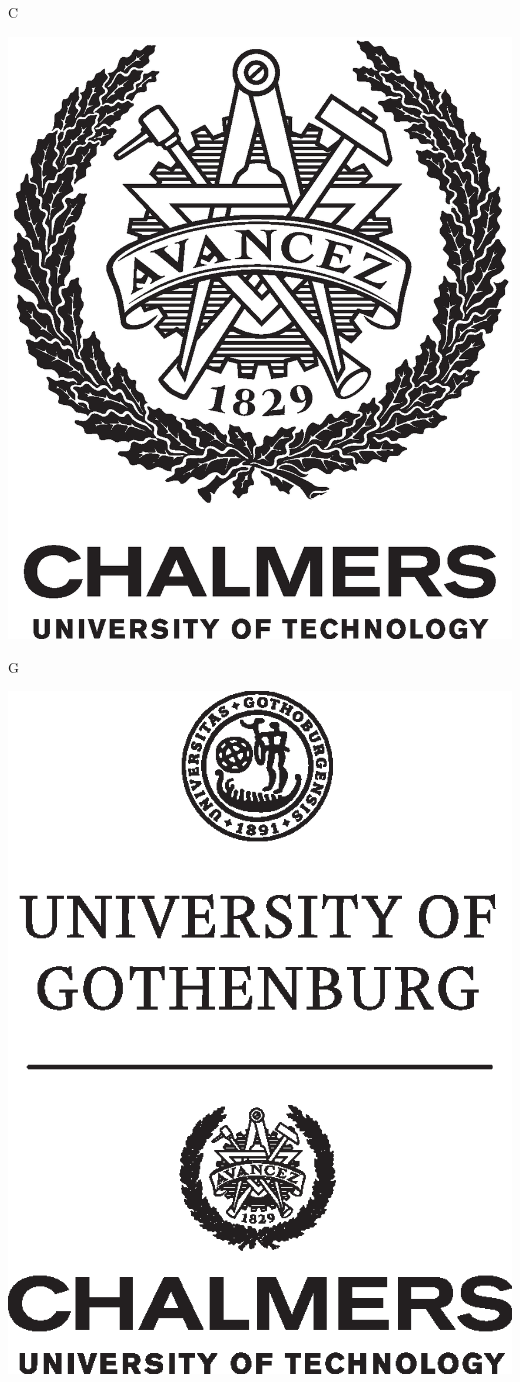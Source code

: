 \vfill
\if\InstitutionLocation C   %
\centerline{\includegraphics[width=0.2\pdfpagewidth]{figure/auxiliary/AvancezChalmersU_black_centered.eps}}
\fi
\if\InstitutionLocation G
\centerline{\includegraphics[width=0.3\pdfpagewidth]{figure/auxiliary/chalmers_gu_black_centered_eng.eps}}
\fi
\vspace{14mm}
